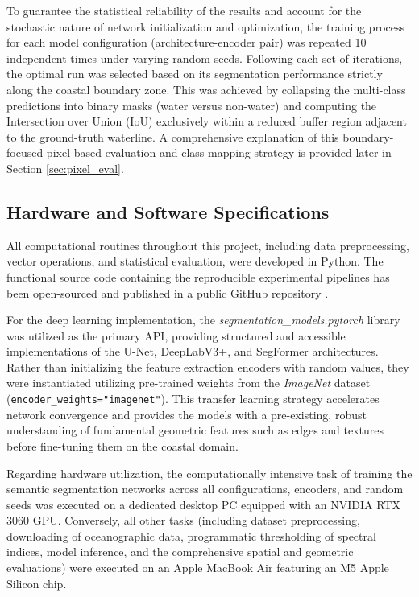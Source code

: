 ﻿\documentclass[ENG]{TFUOC}%
\begin{document}
To guarantee the statistical reliability of the results and account for the stochastic nature of network initialization and optimization, the training process for each model configuration (architecture-encoder pair) was repeated 10 independent times under varying random seeds. Following each set of iterations, the optimal run was selected based on its segmentation performance strictly along the coastal boundary zone. This was achieved by collapsing the multi-class predictions into binary masks (water versus non-water) and computing the Intersection over Union (IoU) exclusively within a reduced buffer region adjacent to the ground-truth waterline. A comprehensive explanation of this boundary-focused pixel-based evaluation and class mapping strategy is provided later in Section \ref{sec:pixel_eval}.

\subsection{Hardware and Software Specifications}
\label{sec:hardware_software}

All computational routines throughout this project, including data preprocessing, vector operations, and statistical evaluation, were developed in Python. The functional source code containing the reproducible experimental pipelines has been open-sourced and published in a public GitHub repository \citep{github_sentinel2-coastline-benchmarking}.

For the deep learning implementation, the \textit{segmentation\_models.pytorch} library was utilized as the primary API, providing structured and accessible implementations of the U-Net, DeepLabV3+, and SegFormer architectures. Rather than initializing the feature extraction encoders with random values, they were instantiated utilizing pre-trained weights from the \textit{ImageNet} dataset (\texttt{encoder\_weights="imagenet"}). This transfer learning strategy accelerates network convergence and provides the models with a pre-existing, robust understanding of fundamental geometric features such as edges and textures before fine-tuning them on the coastal domain.

Regarding hardware utilization, the computationally intensive task of training the semantic segmentation networks across all configurations, encoders, and random seeds was executed on a dedicated desktop PC equipped with an NVIDIA RTX 3060 GPU. Conversely, all other tasks (including dataset preprocessing, downloading of oceanographic data, programmatic thresholding of spectral indices, model inference, and the comprehensive spatial and geometric evaluations) were executed on an Apple MacBook Air featuring an M5 Apple Silicon chip.
\end{document}
